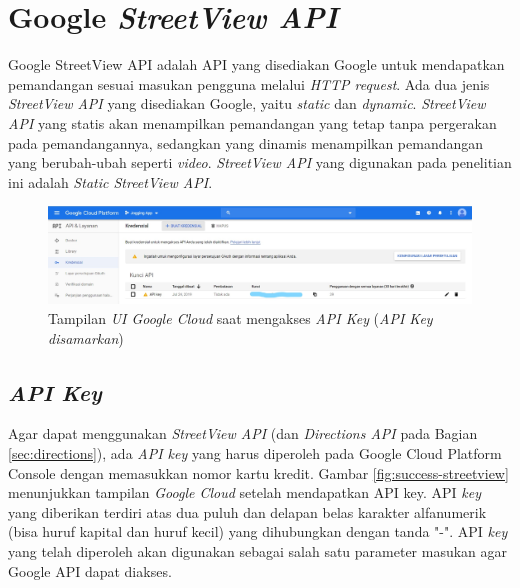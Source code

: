 \section{Google \it{StreetView API}}
\label{sec:streetview}
Google StreetView API adalah API yang disediakan Google untuk mendapatkan pemandangan sesuai masukan pengguna melalui \textit{HTTP request}. Ada dua jenis {\it StreetView API} yang disediakan Google, yaitu {\it static} dan {\it dynamic}. {\it StreetView API} yang statis akan menampilkan pemandangan yang tetap tanpa pergerakan pada pemandangannya, sedangkan yang dinamis menampilkan pemandangan yang berubah-ubah seperti {\it video}. {\it StreetView API} yang digunakan pada penelitian ini adalah {\it Static StreetView API}.


\begin{figure}[h]
	\centering
		\includegraphics[width=6in]{Gambar/google_cloud.png}
	\caption{Tampilan \textit{UI Google Cloud} saat mengakses \textit{API Key} (\textit{API Key disamarkan})}
	\label{fig:googlecloud}
\end{figure}

\subsection{{\it API Key}}
\label{subs:api-key}
Agar dapat menggunakan {\it StreetView API} (dan \textit{Directions API} pada Bagian \ref{sec:directions}), ada {\it API key} yang harus diperoleh pada Google Cloud Platform Console dengan memasukkan nomor kartu kredit. Gambar \ref{fig:success-streetview} menunjukkan tampilan \textit{Google Cloud} setelah mendapatkan API key. API {\it key} yang diberikan terdiri atas dua puluh dan delapan belas karakter alfanumerik (bisa huruf kapital dan huruf kecil) yang dihubungkan dengan tanda "-". API {\it key} yang telah diperoleh akan digunakan sebagai salah satu parameter masukan agar Google API dapat diakses.


